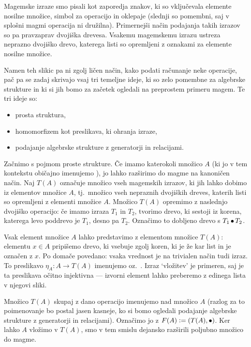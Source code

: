 Magemske izraze smo pisali kot zaporedja znakov, ki so vključevala elemente nosilne množice, simbol za operacijo in oklepaje (slednji so pomembni, saj v splošni magmi operacija ni družilna). Primernejši način podajanja takih izrazov so pa pravzaprav dvojiška drevesa. Vsakemu magemskemu izrazu ustreza neprazno dvojiško drevo, katerega listi so opremljeni z oznakami za elemente nosilne množice.


Namen teh slikic pa ni zgolj ličen način, kako podati računanje neke operacije, pač pa se zadaj skrivajo vsaj tri temeljne ideje, ki so zelo pomembne za algebrske strukture in ki si jih bomo za začetek ogledali na preprostem primeru magem. Te tri ideje so:
\begin{itemize}
	\item
		prosta struktura,
	\item
		homomorfizem kot preslikava, ki ohranja izraze,
	\item
		podajanje algebrske strukture z generatorji in relacijami.
\end{itemize}

Začnimo s pojmom proste strukture. Če imamo katerokoli množico $A$ (ki jo v tem kontekstu običajno imenujemo ), jo lahko razširimo do magme na kanoničen način. Naj $T(A)$ označuje množico vseh magemskih izrazov, ki jih lahko dobimo iz elementov množice $A$, tj.~množico vseh nepraznih dvojiških dreves, katerih listi so opremljeni z elementi množice $A$. Množico $T(A)$ opremimo z naslednjo dvojiško operacijo: če imamo izraza $T_1$ in $T_2$, tvorimo drevo, ki sestoji iz korena, katerega levo poddrevo je $T_1$, desno pa $T_2$. Označimo to dobljeno drevo s $T_1 \mathop{\bullet}\nolimits T_2$.

Vsak element množice $A$ lahko predstavimo z elementom množice $T(A)$: elementu $x \in A$ pripišemo drevo, ki vsebuje zgolj koren, ki je že kar list in je označen z $x$. Po domače povedano: vsaka vrednost je na trivialen način tudi izraz. To preslikavo $\eta_A\colon A \to T(A)$ imenujemo  oz.~. Izraz `vložitev' je primeren, saj je ta preslikava očitno injektivna --- izvorni element lahko preberemo z edinega lista v njegovi sliki.

Množico $T(A)$ skupaj z dano operacijo imenujemo  nad množico $A$ (razlog za to poimenovanje bo postal jasen kasneje, ko si bomo ogledali podajanje algebrske strukture z generatorji in relacijami). Označimo jo z $F(A) \mathrel{\mathop:}= (T(A), \mathop{\bullet}\nolimits)$. Ker lahko $A$ vložimo v $T(A)$, smo v tem smislu dejansko razširili poljubno množico do magme.


